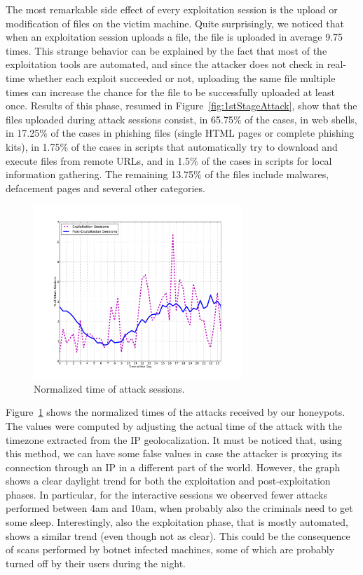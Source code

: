 The most remarkable side effect of every exploitation session is the upload or modification of files on the victim machine. Quite surprisingly, we noticed that when an exploitation session uploads a file, the file is uploaded in average 9.75 times. This strange behavior can be explained by the fact that most of the exploitation tools are automated, and since the attacker does not check in real-time whether each exploit succeeded or not, uploading the same file multiple times can increase the chance for the file to be successfully uploaded at least once. Results of this phase, resumed in Figure~\ref{fig:1stStageAttack}, show that the files uploaded during attack sessions consist, in 65.75\% of the cases, in web shells, in 17.25\% of the cases in phishing files (single HTML pages or complete phishing kits), in 1.75\% of the cases in scripts that automatically try to download and execute files from remote URLs, and in 1.5\% of the cases in scripts for local information gathering. The remaining 13.75\% of the files include malwares, defacement pages and several other categories.

\begin{figure}[tbh]
\centerline{\includegraphics[width=0.7\textwidth]{Images/normalizedAttackTimes.png}}
\caption{Normalized time of attack sessions.\label{fig:normalizedAttackTimes}}
\end{figure}

Figure~\ref{fig:normalizedAttackTimes} shows the normalized times of the attacks received by our honeypots. The values were computed by adjusting the actual time of the attack with the timezone extracted from the IP geolocalization. It must be noticed that, using this method, we can have some false values in case the attacker is proxying its connection through an IP in a different part of the world. However, the graph shows a clear daylight trend for both the exploitation and post-exploitation phases. In particular, for the interactive sessions we observed fewer attacks performed between 4am and 10am, when probably also the criminals need to get some sleep. Interestingly, also the exploitation phase, that is mostly automated, shows a similar trend (even though not as clear). This could be the consequence of scans performed by botnet infected machines, some of which are probably turned off by their users during the night.

